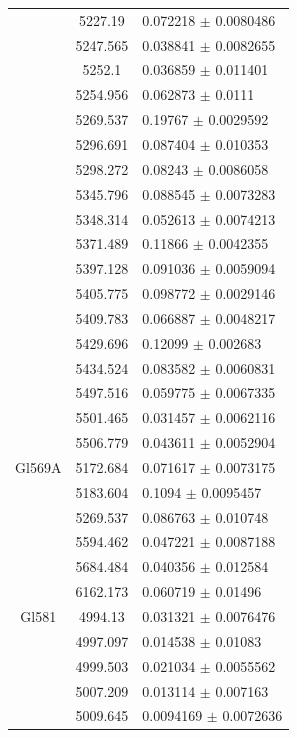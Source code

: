 \begin{longtable}{|c|c|l|}
 & 5227.19 & 0.072218 $\pm$ 0.0080486 \\        
 & 5247.565 & 0.038841 $\pm$ 0.0082655 \\       
 & 5252.1 & 0.036859 $\pm$ 0.011401 \\          
 & 5254.956 & 0.062873 $\pm$ 0.0111 \\          
 & 5269.537 & 0.19767 $\pm$ 0.0029592 \\        
 & 5296.691 & 0.087404 $\pm$ 0.010353 \\        
 & 5298.272 & 0.08243 $\pm$ 0.0086058 \\        
 & 5345.796 & 0.088545 $\pm$ 0.0073283 \\       
 & 5348.314 & 0.052613 $\pm$ 0.0074213 \\       
 & 5371.489 & 0.11866 $\pm$ 0.0042355 \\        
 & 5397.128 & 0.091036 $\pm$ 0.0059094 \\       
 & 5405.775 & 0.098772 $\pm$ 0.0029146 \\       
 & 5409.783 & 0.066887 $\pm$ 0.0048217 \\       
 & 5429.696 & 0.12099 $\pm$ 0.002683 \\         
 & 5434.524 & 0.083582 $\pm$ 0.0060831 \\       
 & 5497.516 & 0.059775 $\pm$ 0.0067335 \\       
 & 5501.465 & 0.031457 $\pm$ 0.0062116 \\       
 & 5506.779 & 0.043611 $\pm$ 0.0052904 \\       
\hline                                          
Gl569A & 5172.684 & 0.071617 $\pm$ 0.0073175 \\ 
 & 5183.604 & 0.1094 $\pm$ 0.0095457 \\         
 & 5269.537 & 0.086763 $\pm$ 0.010748 \\        
 & 5594.462 & 0.047221 $\pm$ 0.0087188 \\       
 & 5684.484 & 0.040356 $\pm$ 0.012584 \\        
 & 6162.173 & 0.060719 $\pm$ 0.01496 \\         
\hline                                          
Gl581 & 4994.13 & 0.031321 $\pm$ 0.0076476 \\   
 & 4997.097 & 0.014538 $\pm$ 0.01083 \\         
 & 4999.503 & 0.021034 $\pm$ 0.0055562 \\       
 & 5007.209 & 0.013114 $\pm$ 0.007163 \\        
 & 5009.645 & 0.0094169 $\pm$ 0.0072636 \\      

\end{longtable}
